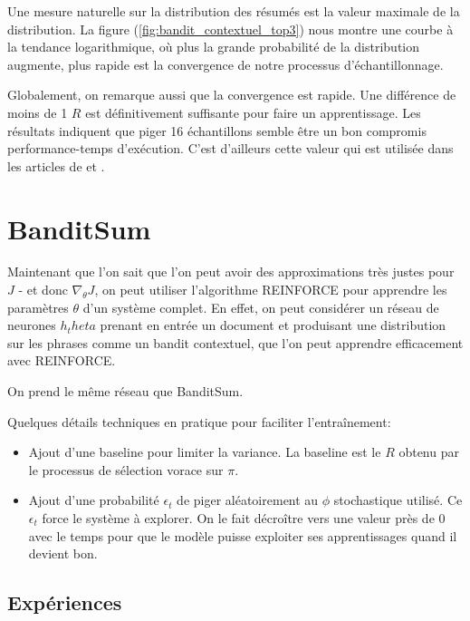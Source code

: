 Une mesure naturelle sur la distribution des résumés est la valeur maximale de
la distribution.
La figure (\ref{fig:bandit_contextuel_top3}) nous montre une courbe à la tendance logarithmique,
où plus la grande probabilité de la distribution augmente, plus rapide est la convergence
de notre processus d'échantillonnage.

Globalement, on remarque aussi que la convergence est rapide.
Une différence de moins de 1 $R$ est définitivement suffisante pour faire un
apprentissage.
Les résultats indiquent que piger 16 échantillons semble être un bon compromis
performance-temps d'exécution.
C'est d'ailleurs cette valeur qui est utilisée dans les articles de \citep{dong2018banditsum}
et \citep{luo-etal-2019-reading}.

\section{BanditSum}

Maintenant que l'on sait que l'on peut avoir des approximations très justes pour
$J$ - et donc $\nabla_\theta J$, on peut utiliser l'algorithme REINFORCE pour apprendre
les paramètres $\theta$ d'un système complet.
En effet, on peut considérer un réseau de neurones $h_theta$ prenant en entrée un document et produisant
une distribution sur les phrases comme un bandit contextuel, que l'on peut apprendre
efficacement avec REINFORCE.

On prend le même réseau que BanditSum.

Quelques détails techniques en pratique pour faciliter l'entraînement:

\begin{itemize}
    \item Ajout d'une baseline pour limiter la variance. La baseline est le $R$ obtenu par
          le processus de sélection vorace sur $\pi$.
    \item Ajout d'une probabilité $\epsilon_t$ de piger aléatoirement au $\phi$ stochastique
          utilisé. Ce $\epsilon_t$ force le système à explorer. On le fait décroître vers une
          valeur près de 0 avec le temps pour que le modèle puisse exploiter ses apprentissages
          quand il devient bon.
\end{itemize}

\subsection{Expériences}

